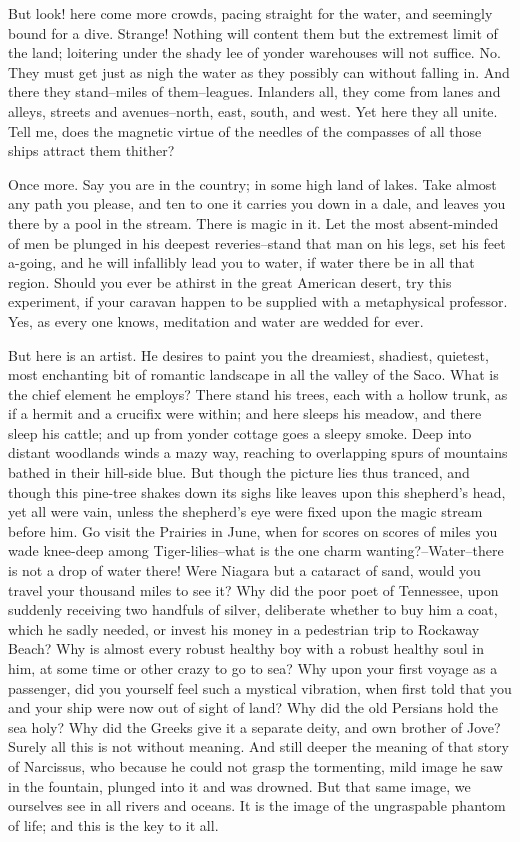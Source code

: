 But look! here come more crowds, pacing straight for the water, and
seemingly bound for a dive. Strange! Nothing will content them but
the extremest limit of the land; loitering under the shady lee of
yonder warehouses will not suffice. No. They must get just as nigh
the water as they possibly can without falling in. And there they
stand--miles of them--leagues. Inlanders all, they come from lanes
and alleys, streets and avenues--north, east, south, and west. Yet
here they all unite. Tell me, does the magnetic virtue of the
needles of the compasses of all those ships attract them thither?

Once more. Say you are in the country; in some high land of lakes.
Take almost any path you please, and ten to one it carries you down
in a dale, and leaves you there by a pool in the stream. There is
magic in it. Let the most absent-minded of men be plunged in his
deepest reveries--stand that man on his legs, set his feet a-going,
and he will infallibly lead you to water, if water there be in all
that region. Should you ever be athirst in the great American
desert, try this experiment, if your caravan happen to be supplied
with a metaphysical professor. Yes, as every one knows, meditation
and water are wedded for ever.

But here is an artist. He desires to paint you the dreamiest,
shadiest, quietest, most enchanting bit of romantic landscape in all
the valley of the Saco. What is the chief element he employs? There
stand his trees, each with a hollow trunk, as if a hermit and a
crucifix were within; and here sleeps his meadow, and there sleep his
cattle; and up from yonder cottage goes a sleepy smoke. Deep into
distant woodlands winds a mazy way, reaching to overlapping spurs of
mountains bathed in their hill-side blue. But though the picture
lies thus tranced, and though this pine-tree shakes down its sighs
like leaves upon this shepherd's head, yet all were vain, unless the
shepherd's eye were fixed upon the magic stream before him. Go visit
the Prairies in June, when for scores on scores of miles you wade
knee-deep among Tiger-lilies--what is the one charm
wanting?--Water--there is not a drop of water there! Were Niagara
but a cataract of sand, would you travel your thousand miles to see
it? Why did the poor poet of Tennessee, upon suddenly receiving two
handfuls of silver, deliberate whether to buy him a coat, which he
sadly needed, or invest his money in a pedestrian trip to Rockaway
Beach? Why is almost every robust healthy boy with a robust healthy
soul in him, at some time or other crazy to go to sea? Why upon your
first voyage as a passenger, did you yourself feel such a mystical
vibration, when first told that you and your ship were now out of
sight of land? Why did the old Persians hold the sea holy? Why did
the Greeks give it a separate deity, and own brother of Jove? Surely
all this is not without meaning. And still deeper the meaning of
that story of Narcissus, who because he could not grasp the
tormenting, mild image he saw in the fountain, plunged into it and
was drowned. But that same image, we ourselves see in all rivers and
oceans. It is the image of the ungraspable phantom of life; and this
is the key to it all.

